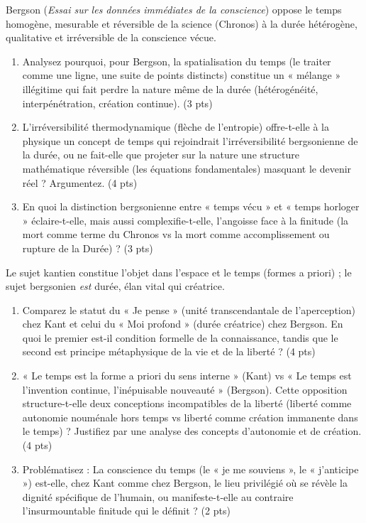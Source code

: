 \documentclass[11pt]{article}
\begin{document}
\begin{exercice}
Bergson (\textit{Essai sur les données immédiates de la conscience}) oppose le temps homogène, mesurable et réversible de la science (Chronos) à la durée hétérogène, qualitative et irréversible de la conscience vécue.
\begin{enumerate}
    \item Analysez pourquoi, pour Bergson, la spatialisation du temps (le traiter comme une ligne, une suite de points distincts) constitue un « mélange » illégitime qui fait perdre la nature même de la durée (hétérogénéité, interpénétration, création continue). (3 pts)
    \item L'irréversibilité thermodynamique (flèche de l'entropie) offre-t-elle à la physique un concept de temps qui rejoindrait l'irréversibilité bergsonienne de la durée, ou ne fait-elle que projeter sur la nature une structure mathématique réversible (les équations fondamentales) masquant le devenir réel ? Argumentez. (4 pts)
    \item En quoi la distinction bergsonienne entre « temps vécu » et « temps horloger » éclaire-t-elle, mais aussi complexifie-t-elle, l'angoisse face à la finitude (la mort comme terme du Chronos vs la mort comme accomplissement ou rupture de la Durée) ? (3 pts)
\end{enumerate}
\end{exercice}

\begin{exercice}
Le sujet kantien constitue l'objet dans l'espace et le temps (formes a priori) ; le sujet bergsonien \textit{est} durée, élan vital qui créatrice.
\begin{enumerate}
    \item Comparez le statut du « Je pense » (unité transcendantale de l'aperception) chez Kant et celui du « Moi profond » (durée créatrice) chez Bergson. En quoi le premier est-il condition formelle de la connaissance, tandis que le second est principe métaphysique de la vie et de la liberté ? (4 pts)
    \item « Le temps est la forme a priori du sens interne » (Kant) vs « Le temps est l'invention continue, l'inépuisable nouveauté » (Bergson). Cette opposition structure-t-elle deux conceptions incompatibles de la liberté (liberté comme autonomie nouménale hors temps vs liberté comme création immanente dans le temps) ? Justifiez par une analyse des concepts d'autonomie et de création. (4 pts)
    \item Problématisez : La conscience du temps (le « je me souviens », le « j'anticipe ») est-elle, chez Kant comme chez Bergson, le lieu privilégié où se révèle la dignité spécifique de l'humain, ou manifeste-t-elle au contraire l'insurmountable finitude qui le définit ? (2 pts)
\end{enumerate}
\end{exercice}
\end{document}
